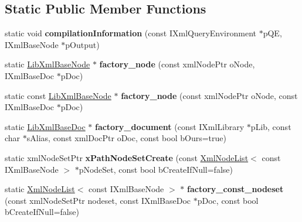 \subsection*{\-Static \-Public \-Member \-Functions}
\begin{DoxyCompactItemize}
\item 
\hypertarget{classgeneral__server_1_1LibXmlLibrary_a6e814b074e3f31e1ba64541880aa07ca}{static void {\bfseries compilation\-Information} (const \-I\-Xml\-Query\-Environment $\ast$p\-Q\-E, \-I\-Xml\-Base\-Node $\ast$p\-Output)}\label{classgeneral__server_1_1LibXmlLibrary_a6e814b074e3f31e1ba64541880aa07ca}

\item 
\hypertarget{classgeneral__server_1_1LibXmlLibrary_af823aa14dc0aee5002e454647b5fcbab}{static \hyperlink{classgeneral__server_1_1LibXmlBaseNode}{\-Lib\-Xml\-Base\-Node} $\ast$ {\bfseries factory\-\_\-node} (const xml\-Node\-Ptr o\-Node, \-I\-Xml\-Base\-Doc $\ast$p\-Doc)}\label{classgeneral__server_1_1LibXmlLibrary_af823aa14dc0aee5002e454647b5fcbab}

\item 
\hypertarget{classgeneral__server_1_1LibXmlLibrary_a81fcaf3caa7051afb897f510035ded6d}{static const \hyperlink{classgeneral__server_1_1LibXmlBaseNode}{\-Lib\-Xml\-Base\-Node} $\ast$ {\bfseries factory\-\_\-node} (const xml\-Node\-Ptr o\-Node, const \-I\-Xml\-Base\-Doc $\ast$p\-Doc)}\label{classgeneral__server_1_1LibXmlLibrary_a81fcaf3caa7051afb897f510035ded6d}

\item 
\hypertarget{classgeneral__server_1_1LibXmlLibrary_a84407e97a1c83930ecf78446099dc46e}{static \hyperlink{classgeneral__server_1_1LibXmlBaseDoc}{\-Lib\-Xml\-Base\-Doc} $\ast$ {\bfseries factory\-\_\-document} (const \-I\-Xml\-Library $\ast$p\-Lib, const char $\ast$s\-Alias, const xml\-Doc\-Ptr o\-Doc, const bool b\-Ours=true)}\label{classgeneral__server_1_1LibXmlLibrary_a84407e97a1c83930ecf78446099dc46e}

\item 
\hypertarget{classgeneral__server_1_1LibXmlLibrary_a80b593cbc1f4a324309a3c5902fba8a6}{static xml\-Node\-Set\-Ptr {\bfseries x\-Path\-Node\-Set\-Create} (const \hyperlink{classgeneral__server_1_1XmlNodeList}{\-Xml\-Node\-List}$<$ const \-I\-Xml\-Base\-Node $>$ $\ast$p\-Node\-Set, const bool b\-Create\-If\-Null=false)}\label{classgeneral__server_1_1LibXmlLibrary_a80b593cbc1f4a324309a3c5902fba8a6}

\item 
\hypertarget{classgeneral__server_1_1LibXmlLibrary_ab2173ed6e31513b3f7d3844098f94190}{static \hyperlink{classgeneral__server_1_1XmlNodeList}{\-Xml\-Node\-List}$<$ const \*
\-I\-Xml\-Base\-Node $>$ $\ast$ {\bfseries factory\-\_\-const\-\_\-nodeset} (const xml\-Node\-Set\-Ptr nodeset, const \-I\-Xml\-Base\-Doc $\ast$p\-Doc, const bool b\-Create\-If\-Null=false)}\label{classgeneral__server_1_1LibXmlLibrary_ab2173ed6e31513b3f7d3844098f94190}


\end{DoxyCompactItemize}
